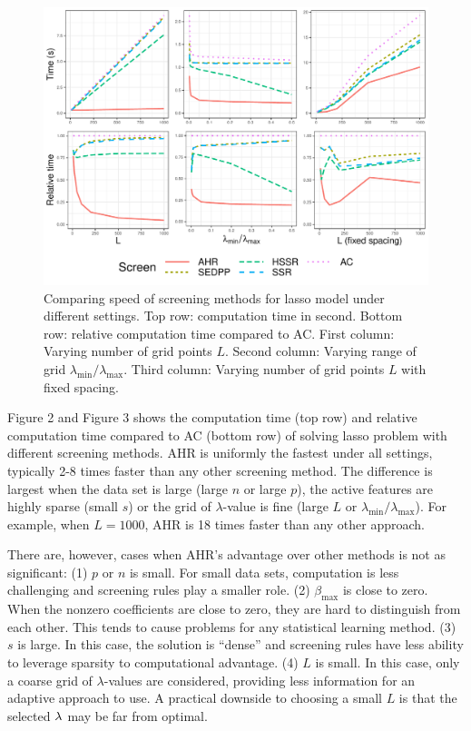 \begin{figure}[h]
    \centering
    \includegraphics[scale = 0.59]{plots/511b.pdf}    \caption{Comparing speed of screening methods for lasso model under different settings. Top row: computation time in second. Bottom row: relative computation time compared to AC. First column: Varying number of grid points $L$. Second column: Varying range of grid $\lambda_{\min}/\lambda_{\max}$. Third column: Varying number of grid points $L$ with fixed spacing.}
    \label{fig:5.1.1b}
\end{figure}

Figure 2 and Figure 3 shows the computation time (top row) and relative computation time compared to AC (bottom row) of solving lasso problem with different screening methods. AHR is uniformly the fastest under all settings, typically 2-8 times faster than any other screening method. The difference is largest when the data set is large (large $n$ or large $p$), the active features are highly sparse (small $s$) or the grid of $\lambda$-value is fine (large $L$ or $\lambda_{\min}/\lambda_{\max}$). For example, when $L=1000$, AHR is 18 times faster than any other approach.

There are, however, cases when AHR's advantage over other methods is not as significant: (1) $p$ or $n$ is small. For small data sets, computation is less challenging and screening rules play a smaller role. (2) $\beta_{\max}$ is close to zero. When the nonzero coefficients are close to zero, they are hard to distinguish from each other. This tends to cause problems for any statistical learning method. (3) $s$ is large. In this case, the solution is ``dense'' and screening rules have less ability to leverage sparsity to computational advantage. (4) $L$ is small. In this case, only a coarse grid of $\lambda$-values are considered, providing less information for an adaptive approach to use. A practical downside to choosing a small $L$ is that the selected $\lambda$ may be far from optimal.

